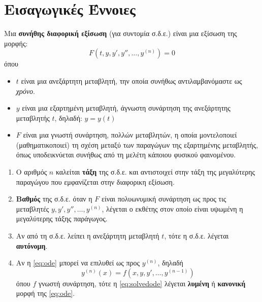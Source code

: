



\pagestyle{vangelis} 


\section{Εισαγωγικές Έννοιες}

\begin{dfn}
Μια \textbf{συνήθης διαφορική εξίσωση} (για συντομία σ.δ.ε.) είναι μια εξίσωση της μορφής:
\begin{equation}\label{eq:ode}
F(t,y,y',y'',\ldots,y^{(n)})=0
\end{equation}
όπου 
\begin{itemize}
\item $t$ είναι μια ανεξάρτητη μεταβλητή, την οποία συνήθως αντιλαμβανόμαστε ως \textit{χρόνο}. 
\item $y$ είναι μια εξαρτημένη μεταβλητή, άγνωστη συνάρτηση της ανεξάρτητης μεταβλητής $t$, δηλαδή: $y=y(t)$
\item $F$ είναι μια γνωστή συνάρτηση, πολλών μεταβλητών, η οποία μοντελοποιεί (μαθηματικοποιεί) τη σχέση μεταξύ των παραγώγων της εξαρτημένης μεταβλητής, όπως υποδεικνύεται συνήθως από τη μελέτη κάποιου φυσικού φαινομένου.
\end{itemize}
\end{dfn}



\begin{dfns}
\begin{enumerate}
\item Ο αριθμός $n$ καλείται \textbf{τάξη} της σ.δ.ε. και αντιστοιχεί στην τάξη της μεγαλύτερης παραγώγου που εμφανίζεται στην διαφορικη εξίσωση.
\item \textbf{Βαθμός} της σ.δ.ε. όταν η $F$ είναι πολυωνυμική συνάρτηση ως προς τις μεταβλητές $y,y',y'',\ldots, y^{(n)}$, λέγεται ο εκθέτης στον οποίο είναι υψωμένη η μεγαλύτερης τάξης παράγωγος.
\item Αν από τη σ.δ.ε. λείπει η ανεξάρτητη μεταβλητή $t$, τότε η σ.δ.ε. λέγεται \textbf{αυτόνομη}.
\item Αν η \eqref{eq:ode} μπορεί να επιλυθεί ως προς $y^{(n)}$, δηλαδή 
\begin{equation}\label{eq:solvedode}
y^{(n)}(x)=f(x,y,y',\ldots ,y^{(n-1)})
\end{equation}
όπου $f$ γνωστή συνάρτηση, τότε η \eqref{eq:solvedode} λέγεται \textbf{λυμένη} ή \textbf{κανονική} μορφή της \eqref{eq:ode}.

\end{enumerate}
\end{dfns}

